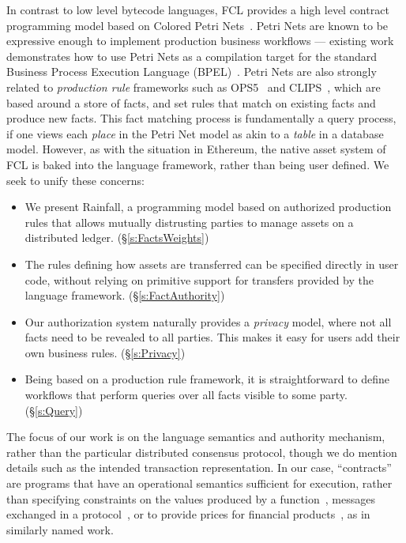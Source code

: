 In contrast to low level bytecode languages, FCL provides a high level contract programming model based on Colored Petri Nets~\cite{Jensen1981:ColouredPetri}. Petri Nets are known to be expressive enough to implement production business workflows --- existing work demonstrates how to use Petri Nets as a compilation target for the standard Business Process Execution Language (BPEL)~\cite{Lohmann2009:PetriBPEL}. Petri Nets are also strongly related to \emph{production rule} frameworks such as OPS5~\cite{Forgy1981:OPS5} and CLIPS~\cite{Riley2017:CLIPS}, which are based around a store of facts, and set rules that match on existing facts and produce new facts. This fact matching process is fundamentally a query process, if one views each \emph{place} in the Petri Net model as akin to a \emph{table} in a database model. However, as with the situation in Ethereum, the native asset system of FCL is baked into the language framework, rather than being user defined. We seek to unify these concerns:

\begin{itemize}
\item We present Rainfall, a programming model based on authorized production rules that allows mutually distrusting parties to manage assets on a distributed ledger. (\S\ref{s:FactsWeights})

\item The rules defining how assets are transferred can be specified directly in user code, without relying on primitive support for transfers provided by the language framework. (\S\ref{s:FactAuthority})

\item Our authorization system naturally provides a \emph{privacy} model, where not all facts need to be revealed to all parties. This makes it easy for users add their own business rules. (\S\ref{s:Privacy})

\item Being based on a production rule framework, it is straightforward to define workflows that perform queries over all facts visible to some party. (\S\ref{s:Query})

\end{itemize}

The focus of our work is on the language semantics and authority mechanism, rather than the particular distributed consensus protocol, though we do mention details such as the intended transaction representation. In our case, ``contracts'' are programs that have an operational semantics sufficient for execution, rather than specifying constraints on the values produced by a function~\cite{Findler2002:Contracts}, messages exchanged in a protocol~\cite{Das2019:Resource, Deon2019:CSL}, or to provide prices for financial products~\cite{PeytonJones2000:Composing}, as in similarly named work.




